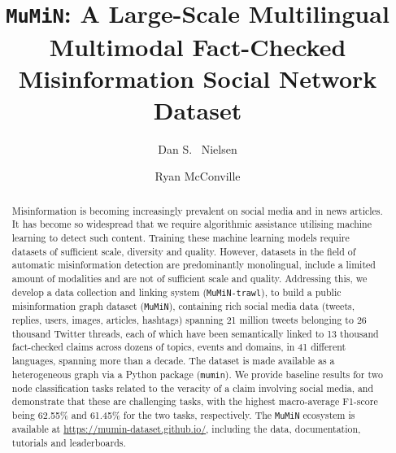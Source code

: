 \documentclass[sigconf,natbib=true,anonymous=false,nonacm]{acmart}
\begin{document}
\def \datasetname {\texttt{MuMiN}\xspace}
\def \trawlname {\texttt{MuMiN-trawl}\xspace}
\def \pkgname {\texttt{mumin}\xspace}
\def \dataseturl {\url{https://mumin-dataset.github.io/}}

\setlength{\tabcolsep}{1pt}

\title{\datasetname: A Large-Scale Multilingual Multimodal Fact-Checked
       Misinformation Social Network Dataset}

\author{Dan S. ~Nielsen}
\author{Ryan McConville}

\renewcommand{\shortauthors}{Nielsen and McConville}

\begin{abstract}
    Misinformation is becoming increasingly prevalent on social media and in
    news articles. It has become so widespread that we require algorithmic
    assistance utilising machine learning to detect such content. Training
    these machine learning models require datasets of sufficient scale,
    diversity and quality. However, datasets in the field of automatic
    misinformation detection are predominantly monolingual, include a limited
    amount of modalities and are not of sufficient scale and quality.
    Addressing this, we develop a data collection and linking system
    (\trawlname), to build a public misinformation graph dataset
    (\datasetname), containing rich social media data (tweets, replies, users,
    images, articles, hashtags) spanning 21 million tweets belonging to 26
    thousand Twitter threads, each of which have been semantically linked to 13
    thousand fact-checked claims across dozens of topics, events and domains,
    in 41 different languages, spanning more than a decade. The dataset is made
    available as a heterogeneous graph via a Python package (\pkgname). We
    provide baseline results for two node classification tasks related to the
    veracity of a claim involving social media, and demonstrate that these are
    challenging tasks, with the highest macro-average F1-score being 62.55\%
    and 61.45\% for the two tasks, respectively. The \datasetname ecosystem is
    available at \dataseturl, including the data, documentation, tutorials and
    leaderboards.
\end{abstract}
\end{document}
